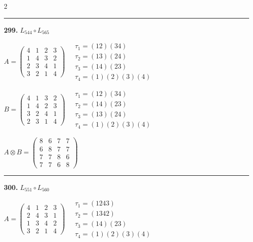\begin{multicols}{2}
\vspace{0.3em}
\hrule
\vspace{0.3em}

\noindent\textbf{299.} $L_{544} \circ L_{565}$

$A = \begin{pmatrix} 4 & 1 & 2 & 3 \\ 1 & 4 & 3 & 2 \\ 2 & 3 & 4 & 1 \\ 3 & 2 & 1 & 4 \end{pmatrix} \quad \begin{matrix} \tau_{1}=(1 2)(3 4) \\ \tau_{2}=(1 3)(2 4) \\ \tau_{3}=(1 4)(2 3) \\ \tau_{4}=(1)(2)(3)(4) \end{matrix}$

$B = \begin{pmatrix} 4 & 1 & 3 & 2 \\ 1 & 4 & 2 & 3 \\ 3 & 2 & 4 & 1 \\ 2 & 3 & 1 & 4 \end{pmatrix} \quad \begin{matrix} \tau_{1}=(1 2)(3 4) \\ \tau_{2}=(1 4)(2 3) \\ \tau_{3}=(1 3)(2 4) \\ \tau_{4}=(1)(2)(3)(4) \end{matrix}$

$A \otimes B = \begin{pmatrix} 8 & 6 & 7 & 7 \\ 6 & 8 & 7 & 7 \\ 7 & 7 & 8 & 6 \\ 7 & 7 & 6 & 8 \end{pmatrix}$

\vspace{0.3em}
\hrule
\vspace{0.3em}

\noindent\textbf{300.} $L_{551} \circ L_{560}$

$A = \begin{pmatrix} 4 & 1 & 2 & 3 \\ 2 & 4 & 3 & 1 \\ 1 & 3 & 4 & 2 \\ 3 & 2 & 1 & 4 \end{pmatrix} \quad \begin{matrix} \tau_{1}=(1 2 4 3) \\ \tau_{2}=(1 3 4 2) \\ \tau_{3}=(1 4)(2 3) \\ \tau_{4}=(1)(2)(3)(4) \end{matrix}$


\end{multicols}
